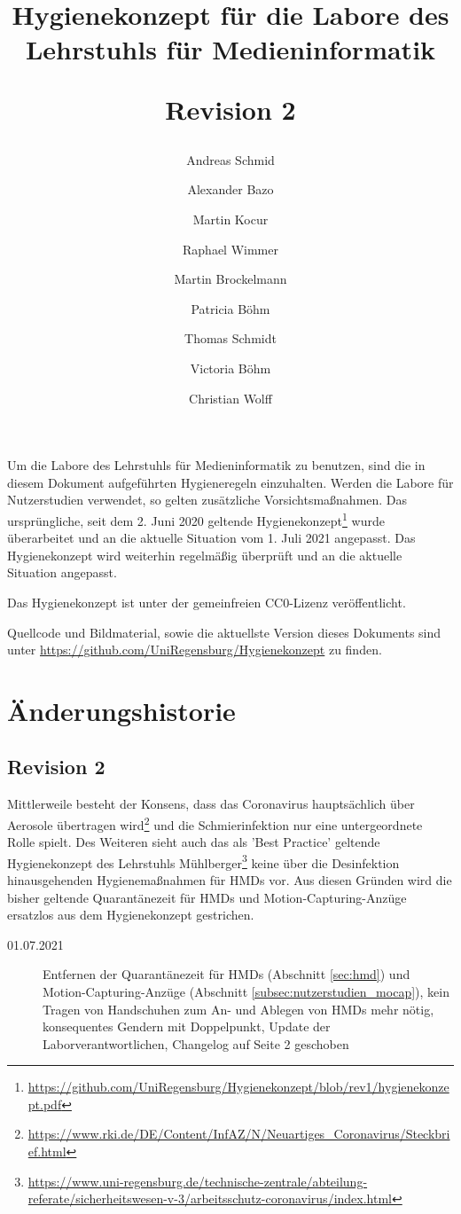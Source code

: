 \documentclass[hidelinks,12pt]{extarticle}
\title{
    \bfseries
    \sffamily
    Hygienekonzept für die Labore des Lehrstuhls für Medieninformatik

    \medskip
    \large{Revision 2}
}
\author{Andreas Schmid}
\author{Alexander Bazo}
\author{Martin Kocur}
\author{Raphael Wimmer}
\author{Martin Brockelmann}
\author{Patricia Böhm}
\author{Thomas Schmidt}
\author{Victoria Böhm}
\author{Christian Wolff}
\affil{Lehrstuhl für Medieninformatik, Universität Regensburg}
\begin{document}
\onehalfspacing
\maketitle

\noindent
Um die Labore des Lehrstuhls für Medieninformatik zu benutzen, sind die in diesem Dokument aufgeführten Hygieneregeln einzuhalten.
Werden die Labore für Nutzerstudien verwendet, so gelten zusätzliche Vorsichtsmaßnahmen.
Das ursprüngliche, seit dem 2. Juni 2020 geltende Hygienekonzept\footnote{\url{https://github.com/UniRegensburg/Hygienekonzept/blob/rev1/hygienekonzept.pdf}} wurde überarbeitet und an die aktuelle Situation vom 1. Juli 2021 angepasst.
Das Hygienekonzept wird weiterhin regelmäßig überprüft und an die aktuelle Situation angepasst.

\medskip
\noindent
Das Hygienekonzept ist unter der gemeinfreien CC0-Lizenz veröffentlicht.

\noindent
Quellcode und Bildmaterial, sowie die aktuellste Version dieses Dokuments sind unter \url{https://github.com/UniRegensburg/Hygienekonzept} zu finden.

\newpage

\section*{Änderungshistorie}\label{app:changelog}

\subsection*{Revision 2}

Mittlerweile besteht der Konsens, dass das Coronavirus hauptsächlich über Aerosole übertragen wird\footnote{\url{https://www.rki.de/DE/Content/InfAZ/N/Neuartiges_Coronavirus/Steckbrief.html}} und die Schmierinfektion nur eine untergeordnete Rolle spielt.
Des Weiteren sieht auch das als 'Best Practice' geltende Hygienekonzept des Lehrstuhls Mühlberger\footnote{\url{ https://www.uni-regensburg.de/technische-zentrale/abteilung-referate/sicherheitswesen-v-3/arbeitsschutz-coronavirus/index.html}} keine über die Desinfektion hinausgehenden Hygienemaßnahmen für HMDs vor.
Aus diesen Gründen wird die bisher geltende Quarantänezeit für HMDs und Motion-Capturing-Anzüge ersatzlos aus dem Hygienekonzept gestrichen.

\begin{description}
    \item[01.07.2021] Entfernen der Quarantänezeit für HMDs (Abschnitt \ref{sec:hmd}) und Motion-Capturing-Anzüge (Abschnitt \ref{subsec:nutzerstudien_mocap}), kein Tragen von Handschuhen zum An- und Ablegen von HMDs mehr nötig, konsequentes Gendern mit Doppelpunkt, Update der Laborverantwortlichen, Changelog auf Seite 2 geschoben
\end{description}
\end{document}
